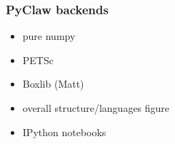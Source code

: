 \subsubsection{PyClaw backends}
\begin{itemize}
    \item pure numpy
    \item PETSc
    \item Boxlib (Matt)
\end{itemize}

\begin{itemize}
    \item overall structure/languages figure
    \item IPython notebooks
\end{itemize}
